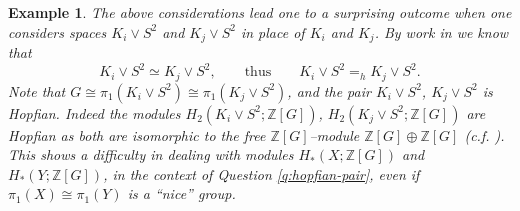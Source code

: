 \documentclass[reqno,12pt]{amsart}
\theoremstyle{ourremark}
\newtheorem{example}[theorem]{Example}
\numberwithin{equation}{section}
\numberwithin{theorem}{section}
\begin{document}
\begin{example}
 The above considerations lead one to a surprising outcome when one considers spaces $K_i\vee S^2$ and $K_j\vee S^2$ in place of $K_i$ and $K_j$. By work in 
\cite{Berridge-Dunwoody79, Harlander-Jensen06} we know that 
\[
 K_i\vee S^2\simeq K_j\vee S^2,\qquad\text{thus}\qquad K_i\vee S^2=_h K_j\vee S^2.
\]
Note that $G\cong \pi_1(K_i\vee S^2)\cong \pi_1(K_j\vee S^2)$, and the pair $K_i\vee S^2$, $K_j\vee S^2$ is  Hopfian. Indeed the modules $H_2(K_i\vee S^2;{\mathbb{Z}}[G])$, $H_2(K_j\vee S^2;{\mathbb{Z}}[G])$ are Hopfian as both are isomorphic to the free ${\mathbb{Z}}[G]$--module ${\mathbb{Z}}[G]\oplus{\mathbb{Z}}[G]$ (c.f. \cite{Berridge-Dunwoody79}). This shows a difficulty in dealing with modules  $H_\ast(X;{\mathbb{Z}}[G])$ and  $H_\ast(Y;{\mathbb{Z}}[G])$, in the context of Question \ref{q:hopfian-pair}, even if $\pi_1(X)\cong\pi_1(Y)$ is a ``nice'' group.
\end{example}
\end{document}
